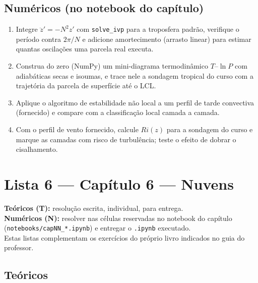 \documentclass[11pt]{article}
\newcommand{\instrucoes}{%
\begin{caixalista}
\textbf{Teóricos (T):} resolução escrita, individual, para entrega.\\
\textbf{Numéricos (N):} resolver nas células reservadas no notebook do
capítulo (\texttt{notebooks/capNN\_*.ipynb}) e entregar o
\texttt{.ipynb} executado.\\
Estas listas complementam os exercícios do próprio livro indicados no
guia do professor.
\end{caixalista}}
\begin{document}
\subsection*{Numéricos (no notebook do capítulo)}

\begin{enumerate}[label=\textbf{N\arabic*.},itemsep=4pt]
  \item Integre $\ddot z' = -N^2 z'$ com \texttt{solve\_ivp} para a
        troposfera padrão, verifique o período contra $2\pi/N$ e adicione
        amortecimento (arrasto linear) para estimar quantas oscilações
        uma parcela real executa.
  \item Construa do zero (NumPy) um mini-diagrama termodinâmico
        $T$--$\ln P$ com adiabáticas secas e isoumas, e trace nele a
        sondagem tropical do curso com a trajetória da parcela de
        superfície até o LCL.
  \item Aplique o algoritmo de estabilidade não local a um perfil de
        tarde convectiva (fornecido) e compare com a classificação local
        camada a camada.
  \item Com o perfil de vento fornecido, calcule $Ri(z)$ para a sondagem
        do curso e marque as camadas com risco de turbulência; teste o
        efeito de dobrar o cisalhamento.
\end{enumerate}

\clearpage
\section*{Lista 6 --- Capítulo 6 --- Nuvens}
\instrucoes

\subsection*{Teóricos}
\end{document}
